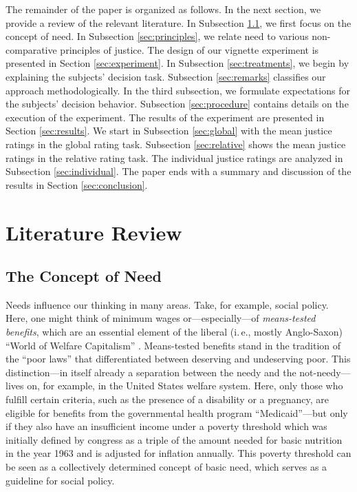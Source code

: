 \documentclass[12pt]{scrartcl}
\begin{document}
The remainder of the paper is organized as follows.
In the next section, we provide a review of the relevant literature.
In Subsection \ref{sec:need}, we first focus on the concept of need.
In Subsection \ref{sec:principles}, we relate need to various non-comparative principles of justice.
The design of our vignette experiment is presented in Section \ref{sec:experiment}.
In Subsection \ref{sec:treatments}, we begin by explaining the subjects' decision task.
Subsection \ref{sec:remarks} classifies our approach methodologically.
In the third subsection, we formulate expectations for the subjects' decision behavior.
Subsection \ref{sec:procedure} contains details on the execution of the experiment.
The results of the experiment are presented in Section \ref{sec:results}.
We start in Subsection \ref{sec:global} with the mean justice ratings in the global rating task.
Subsection \ref{sec:relative} shows the mean justice ratings in the relative rating task.
The individual justice ratings are analyzed in Subsection \ref{sec:individual}.
The paper ends with a summary and discussion of the results in Section \ref{sec:conclusion}.


\section{Literature Review}\label{sec:background}


\subsection{The Concept of Need}\label{sec:need}
Needs influence our thinking in many areas.
Take, for example, social policy.
Here, one might think of minimum wages or---especially---of \textit{means-tested benefits}, which are an essential element of the liberal (i.\,e., mostly Anglo-Saxon) ``World of Welfare Capitalism'' \citep{esping-andersen_three_1990}.
Means-tested benefits stand in the tradition of the ``poor laws'' that differentiated between deserving and undeserving poor.
This distinction---in itself already a separation between the needy and the not-needy---lives on, for example, in the United States welfare system.
Here, only those who fulfill certain criteria, such as the presence of a disability or a pregnancy, are eligible for benefits from the governmental health program ``Medicaid''---but only if they also have an insufficient income under a poverty threshold which was initially defined by congress as a triple of the amount needed for basic nutrition in the year 1963 and is adjusted for inflation annually.
This poverty threshold can be seen as a collectively determined concept of basic need, which serves as a guideline for social policy.
\end{document}

